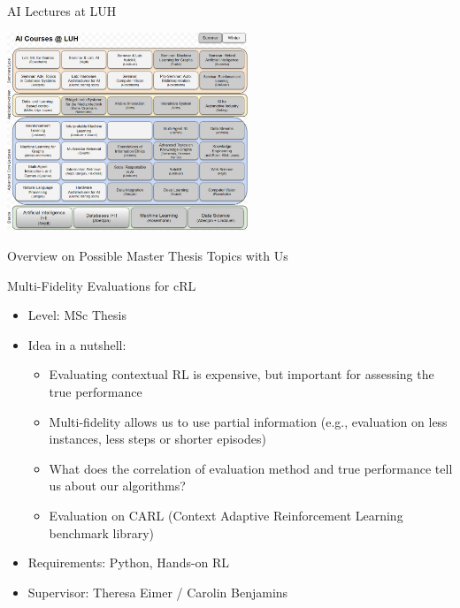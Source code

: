 \documentclass[aspectratio=169]{../latex_main/tntbeamer}  %
\begin{document}
\begin{frame}[c]{AI Lectures at LUH}
	
	\centering
	\includegraphics[width=0.54\textwidth]{w11_wrap_up/images/ai_courses_luh.PNG}
	
\end{frame}
\begin{frame}[c]{}
	
	\centering
	\huge
	Overview on Possible Master Thesis Topics with Us
	
\end{frame}
\begin{frame}[c]{Multi-Fidelity Evaluations for cRL}
	
    \begin{itemize}
		\item Level: MSc Thesis
		\item Idea in a nutshell:
		\begin{itemize}
		    \item Evaluating contextual RL is expensive, but important for assessing the true performance
		    \item Multi-fidelity allows us to use partial information (e.g., evaluation on less instances, less steps or shorter episodes)
		    \item What does the correlation of evaluation method and true performance tell us about our algorithms?
		    \item Evaluation on CARL (Context Adaptive Reinforcement Learning benchmark library)
		\end{itemize}
		\item Requirements: Python, Hands-on RL
		\item Supervisor: Theresa Eimer / Carolin Benjamins
	\end{itemize}
	
\end{frame}
\end{document}
